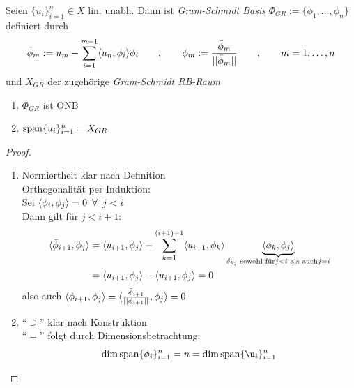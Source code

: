 \begin{defn}
	Seien $\{u_i\}_{i=1}^n \in X$ lin. unabh. Dann ist \emph{Gram-Schmidt Basis} $\Phi_{GR} := \{\phi_1,\dots, \phi_n\}$ definiert durch
\[
	\bar{\phi}_m := u_m - \sum\limits_{i=1}^{m-1} \dotp{u_n}{\phi_i}\phi_i \qquad, \qquad \phi_m := \frac{\bar{\phi}_m}{||\bar{\phi}_m||} \qquad, \qquad m=1,\dots,n	
\]
und $X_{GR}$ der zugehörige \emph{Gram-Schmidt RB-Raum}
\end{defn}

\begin{lemma} \beginwithlist
\begin{enumerate}
	\item $\Phi_{GR}$ ist ONB
	\item $\operatorname{span}\{u_i\}_{i=1}^n = X_{GR}$
\end{enumerate}
\begin{proof}
	\begin{enumerate}
		\item Normiertheit klar nach Definition \\
		Orthogonalität per Induktion: \\
		Sei $\dotp{\phi_i}{\phi_j} = 0 \,\,\, \forall \,\,\, j < i$ \\
		Dann gilt für $j < i+1$:
		\begin{align*}
			\dotp{\bar{\phi}_{i+1}}{\phi_j} &= \dotp{u_{i+1}}{\phi_j} - \sum\limits_{k=1}^{(i+1) -1} \dotp{u_{i+1}}{\phi_k} \underbrace{\dotp{\phi_k}{\phi_j}}_{\delta_{kj} \text{ sowohl für} j<i \text{ als auch} j=i}	 \\
			&= \dotp{u_{i+1}}{\phi_j} - \dotp{u_{i+1}}{\phi_j}= 0
		\end{align*}
		also auch $\dotp{\phi_{i+1}}{\phi_j} = \dotp{\frac{\bar{\phi}_{i+1}}{||\phi_{i+1} ||}}{\phi_j} = 0$
		\item ``$\supseteq$'' klar nach Konstruktion \\
		``$=$'' folgt durch Dimensionsbetrachtung:
		\[
			\dim \op{span} \{\phi_i\}_{i=1}^n = n = \dim \op{span} \{\u_i\}_{i=1}^n
		\]
	\end{enumerate}
\end{proof}
\end{lemma}


